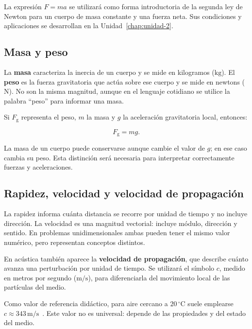 La expresión \(F=ma\) se utilizará como forma introductoria de la segunda ley de Newton para un cuerpo de masa constante y una fuerza neta. Sus condiciones y aplicaciones se desarrollan en la Unidad~\ref{chap:unidad-2}.

\subsection{Masa y peso}
\label{sec:u1-masa-peso}

La \textbf{masa} caracteriza la inercia de un cuerpo y se mide en kilogramos (\(\text{kg}\)). El \textbf{peso} es la fuerza gravitatoria que actúa sobre ese cuerpo y se mide en newtons (\(\text{N}\)). No son la misma magnitud, aunque en el lenguaje cotidiano se utilice la palabra ``peso'' para informar una masa.

Si \(F_\mathrm{g}\) representa el peso, \(m\) la masa y \(g\) la aceleración gravitatoria local, entonces:

\begin{equation}
    F_\mathrm{g}=mg.
    \label{eq:u1-peso}
\end{equation}

La masa de un cuerpo puede conservarse aunque cambie el valor de \(g\); en ese caso cambia su peso. Esta distinción será necesaria para interpretar correctamente fuerzas y aceleraciones.

\subsection{Rapidez, velocidad y velocidad de propagación}
\label{sec:u1-velocidades}

La rapidez informa cuánta distancia se recorre por unidad de tiempo y no incluye dirección. La velocidad es una magnitud vectorial: incluye módulo, dirección y sentido. En problemas unidimensionales ambas pueden tener el mismo valor numérico, pero representan conceptos distintos.

En acústica también aparece la \textbf{velocidad de propagación}, que describe cuánto avanza una perturbación por unidad de tiempo. Se utilizará el símbolo \(c\), medido en metros por segundo (\(\text{m}/\text{s}\)), para diferenciarla del movimiento local de las partículas del medio.

Como valor de referencia didáctico, para aire cercano a \(20\,^{\circ}\text{C}\) suele emplearse \(c\approx343\,\text{m}/\text{s}\)~\cite{cramer1993}. Este valor no es universal: depende de las propiedades y del estado del medio.

